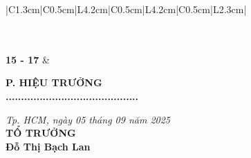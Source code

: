 \documentclass[12pt,a4paper]{article}
\begin{document}
\begin{longtable}{|C{1.3cm}|C{0.5cm}|L{4.2cm}|C{0.5cm}|L{4.2cm}|C{0.5cm}|L{2.3cm}|}
 \\
 \\ \hline
{} \\ \hline

\textbf{15 - 17} &  \\ \hline
\end{longtable}

\vspace{1.5cm}
\noindent
\begin{minipage}[t]{0.45\textwidth}
    \centering
    \textbf{P. HIỆU TRƯỞNG}\\
    \vspace{2.5cm}
    \textbf{...........................................}
\end{minipage}
\hfill
\begin{minipage}[t]{0.45\textwidth}
    \centering
    \textit{Tp. HCM, ngày 05 tháng 09 năm 2025}\\
    \textbf{TỔ TRƯỞNG}\\
    \vspace{2cm}
    \textbf{Đỗ Thị Bạch Lan}
\end{minipage}
\end{document}
